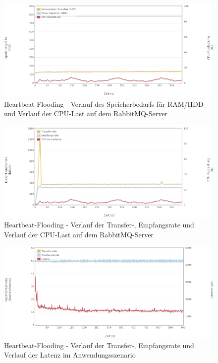\documentclass[	a4paper,
			11pt,
			oneside,
			parskip]{scrartcl}
\begin{document}
		\begin{figure}[!htb]
			\centering
			\includegraphics[width=\textwidth]{img/heartbeat/heartbeat_server1.png}
			\caption{Heartbeat-Flooding - Verlauf des Speicherbedarfs für RAM/HDD und Verlauf der CPU-Last auf dem RabbitMQ-Server}
			\label{fig:heartbeat-server1}
		\end{figure}
		
		\begin{figure}[!htb]
			\centering
			\includegraphics[width=\textwidth]{img/heartbeat/heartbeat_server2.png}
			\caption{Heartbeat-Flooding - Verlauf der Transfer-, Empfangsrate und Verlauf der CPU-Last auf dem RabbitMQ-Server}
			\label{fig:heartbeat-server2}
		\end{figure}
		
		\begin{figure}[!htb]
			\centering
			\includegraphics[width=\textwidth]{img/heartbeat/heartbeat_scenario.png}
			\caption{Heartbeat-Flooding - Verlauf der Transfer-, Empfangsrate und Verlauf der Latenz im Anwendungsszenario}
			\label{fig:heartbeat-scenario}
		\end{figure}
	
\end{document}
